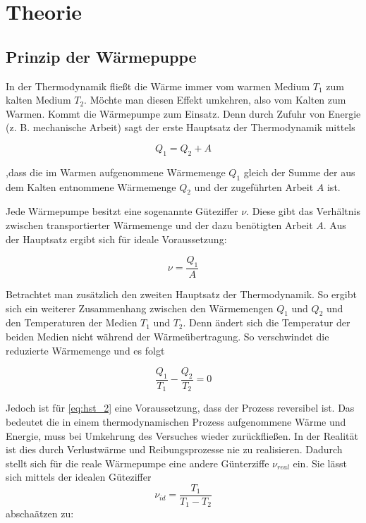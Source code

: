 \section{Theorie}

\subsection{Prinzip der Wärmepuppe}

In der Thermodynamik fließt die Wärme immer 
vom warmen Medium $T_1$ zum kalten Medium $T_2$.
Möchte man diesen Effekt umkehren, also vom Kalten 
zum Warmen. Kommt die Wärmepumpe zum Einsatz.
Denn durch Zufuhr von Energie (z. B. mechanische Arbeit) sagt der erste 
Hauptsatz der Thermodynamik mittels

\begin{equation}
\label{eq:hst_1}
Q_1=Q_2+A
\end{equation}

,dass die im Warmen aufgenommene Wärmemenge $Q_1$ gleich 
der Summe der aus dem Kalten entnommene Wärmemenge $Q_2$
und der zugeführten Arbeit $A$ ist.

Jede Wärmepumpe besitzt eine sogenannte Güteziffer $\nu$.
Diese gibt das Verhältnis zwischen transportierter Wärmemenge 
und der dazu benötigten Arbeit $A$.
Aus der Hauptsatz ergibt sich für ideale Voraussetzung:

\begin{equation}
\label{eq:best_kennziffer}
\nu=\frac{Q_1}{A}
\end{equation}

Betrachtet man zusätzlich den zweiten Hauptsatz der Thermodynamik.
So ergibt sich ein weiterer Zusammenhang zwischen den Wärmemengen 
$Q_1$ und $Q_2$ und den Temperaturen der Medien $T_1$ und $T_2$.
Denn ändert sich die Temperatur der beiden Medien nicht während der 
Wärmeübertragung. 
So verschwindet die reduzierte Wärmemenge und es folgt

\begin{equation}
\label{eq:hst_2}
\frac{Q_1}{T_1}-\frac{Q_2}{T_2}=0
\end{equation}

Jedoch ist für \eqref{eq:hst_2} eine Voraussetzung,
dass der Prozess reversibel ist.
Das bedeutet die in einem thermodynamischen Prozess aufgenommene Wärme 
und Energie, muss bei Umkehrung des Versuches wieder zurückfließen.
In der Realität ist dies durch Verlustwärme und Reibungsprozesse
nie zu realisieren.
Dadurch stellt sich für die reale Wärmepumpe eine andere 
Günterziffe $\nu_{real}$ ein. 
Sie lässt sich mittels der idealen Güteziffer 
\begin{equation*}
\nu_{id}=\frac{T_1}{T_1-T_2}
\end{equation*}
abschaätzen zu:

